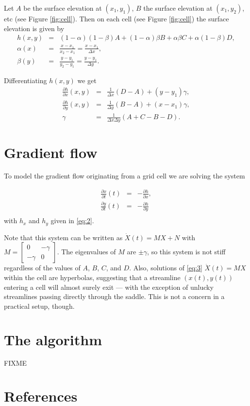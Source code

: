 \documentclass{amsart}
\begin{document}
Let $A$ be the surface elevation at $(x_{1},y_{1})$, $B$ the surface elevation
at $(x_{1}, y_{2})$, etc (see Figure \ref{fig:cell}). Then on each cell (see Figure
\ref{fig:cell}) the surface elevation is given by
\begin{eqnarray}
  \label{eq:1}
  h(x,y) &=& (1-\alpha)(1-\beta)A + (1-\alpha)\beta B + \alpha\beta C +
  \alpha(1-\beta)D,\\
  \alpha(x) &=& \frac{x-x_{1}}{x_{2}-x_{1}} = \frac{x-x_{1}}{\Delta x},\\
  \beta(y) &=& \frac{y-y_{1}}{y_{2}-y_{1}} = \frac{y-y_{1}}{\Delta y}.
\end{eqnarray}

Differentiating $h(x,y)$ we get
\begin{eqnarray}
  \label{eq:2}
  \frac{\partial h}{\partial x}(x,y) &=& \frac{1}{\Delta x}(D-A) + (y-y_{1})
  \gamma,\\
  \frac{\partial h}{\partial y}(x,y) &=& \frac{1}{\Delta y}(B-A) + (x-x_{1})
  \gamma,\\
  \gamma &=& \frac{1}{\Delta x \Delta y}(A + C - B - D).
\end{eqnarray}

\section{Gradient flow}
\label{sec:gradient-flow}

To model the gradient flow originating from a grid cell we are solving the system

\begin{eqnarray}
  \label{eq:3}
  \frac{\partial x}{\partial t}(t) &=& -\frac{\partial h}{\partial x},\\
  \frac{\partial y}{\partial t}(t) &=& -\frac{\partial h}{\partial y}\\
\end{eqnarray}
with $h_{x}$ and $h_{y}$ given in \eqref{eq:2}.

Note that this system can be written as $\dot X(t) = MX + N$ with
$M =
\left[\begin{matrix}
  0 & -\gamma\\
-\gamma & 0
\end{matrix}\right]$.
The eigenvalues of $M$ are $\pm \gamma$, so this system is not stiff regardless
of the values of $A$, $B$, $C$, and $D$. Also, solutions of \eqref{eq:3} $\dot
X(t) = MX$ within the cell are hyperbolas, suggesting that a streamline $(x(t),
y(t))$ entering a cell will almost surely exit --- with the exception of
unlucky streamlines passing directly through the saddle. This is not a concern
in a practical setup, though.

\section{The algorithm}
\label{sec:algorithm}

FIXME

\section{References}
\label{sec:references}



\end{document}
